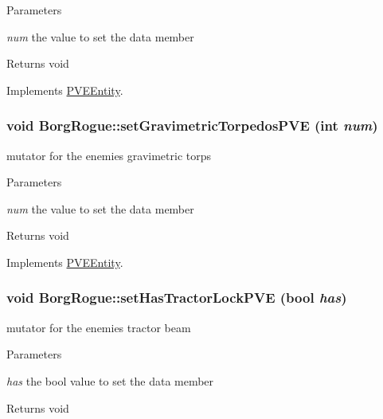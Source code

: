 \begin{DoxyParams}{Parameters}
\item[{\em num}]the value to set the data member\end{DoxyParams}
\begin{DoxyReturn}{Returns}
void 
\end{DoxyReturn}


Implements \hyperlink{classPVEEntity}{PVEEntity}.

\hypertarget{classBorgRogue_a73ff2f1ab55d607fa9a39cfda5c22a8d}{
\subsubsection[{setGravimetricTorpedosPVE}]{\setlength{\rightskip}{0pt plus 5cm}void BorgRogue::setGravimetricTorpedosPVE (int {\em num})}}
\label{db/d4f/classBorgRogue_a73ff2f1ab55d607fa9a39cfda5c22a8d}
mutator for the enemies gravimetric torps


\begin{DoxyParams}{Parameters}
\item[{\em num}]the value to set the data member\end{DoxyParams}
\begin{DoxyReturn}{Returns}
void 
\end{DoxyReturn}


Implements \hyperlink{classPVEEntity}{PVEEntity}.

\hypertarget{classBorgRogue_a81779a2a3027c82452c17fd0503f7d2c}{
\subsubsection[{setHasTractorLockPVE}]{\setlength{\rightskip}{0pt plus 5cm}void BorgRogue::setHasTractorLockPVE (bool {\em has})}}
\label{db/d4f/classBorgRogue_a81779a2a3027c82452c17fd0503f7d2c}
mutator for the enemies tractor beam


\begin{DoxyParams}{Parameters}
\item[{\em has}]the bool value to set the data member\end{DoxyParams}
\begin{DoxyReturn}{Returns}
void 
\end{DoxyReturn}


